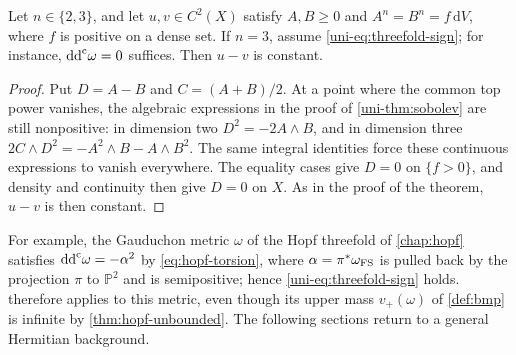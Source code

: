 \begin{corollary}\label{uni-cor:dense-lowdim}\label{cor:gauduchon-surface-uniqueness}
Let $n\in\{2,3\}$, and let $u,v\in C^2(X)$ satisfy $A,B\geq0$ and $A^n=B^n=f\,\mathrm{d}V$, where $f$ is positive on a dense set. If $n=3$, assume \eqref{uni-eq:threefold-sign}; for instance, $\mathrm{dd}^{\mathrm{c}}\omega=0$ suffices. Then $u-v$ is constant.
\end{corollary}

\begin{proof}
Put $D=A-B$ and $C=(A+B)/2$. At a point where the common top power vanishes, the algebraic expressions
in the proof of \cref{uni-thm:sobolev} are still nonpositive: in dimension two $D^2=-2A\wedge B$, and in
dimension three
$2C\wedge D^2=-A^2\wedge B-A\wedge B^2$.
The same integral identities force these continuous expressions to vanish
everywhere.  The equality cases give $D=0$ on $\{f>0\}$, and
density and continuity then give $D=0$ on $X$. As in the proof of the theorem, $u-v$ is then constant.
\end{proof}


For example, the Gauduchon metric $\omega$ of the Hopf threefold of \cref{chap:hopf} satisfies $\mathrm{dd}^{\mathrm{c}}\omega=-\alpha^2$ by \eqref{eq:hopf-torsion}, where $\alpha=\pi^*\omega_{\mathrm{FS}}$ is pulled back by the projection $\pi$ to $\mathbb P^2$ and is semipositive; hence \eqref{uni-eq:threefold-sign} holds.  therefore applies to this metric, even though its upper mass $v_+(\omega)$ of \cref{def:bmp} is infinite by \cref{thm:hopf-unbounded}. The following sections return to a general Hermitian background.
